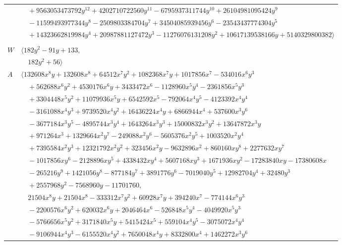 \documentclass[11pt]{article}
\begin{document}
\begin{longtable}{@{}ll@{}}
 & $\quad +9563053473792y^{12}+4202710722560y^{11}-6795937311744y^{10}+26104981095424y^{9}$\\
 & $\quad -11599493977344y^{8}-2509803384704y^{7}+34504085939456y^{6}-23543437774304y^{5}$\\
 & $\quad +14323662819984y^{4}+20987881127472y^{3}-11276076131208y^{2}+10617139538166y+5140329800382\rangle$\\
\addlinespace[2pt]
\multicolumn{2}{@{}p{0.97\textwidth}@{}}{$i=11$, $D_i=8$, $\rho_{ij}$: $1{:}1, \allowbreak 15{:}2, \allowbreak 16{:}2, \allowbreak 17{:}2, \allowbreak 48{:}1, \allowbreak 57{:}1, \allowbreak 64{:}2, \allowbreak 67{:}1$}\\
$W$ & $\langle 182y^{2}-91y+133,$\\
 & $\quad 182y^{2}+56\rangle$\\
$A$ & $\langle 132608x^{8}y+132608x^{8}+64512x^{7}y^{2}+1082368x^{7}y+1017856x^{7}-534016x^{6}y^{3}$\\
 & $\quad +562688x^{6}y^{2}+4530176x^{6}y+3433472x^{6}-1128960x^{5}y^{4}-2361856x^{5}y^{3}$\\
 & $\quad +3304448x^{5}y^{2}+11079936x^{5}y+6542592x^{5}-792064x^{4}y^{5}-4123392x^{4}y^{4}$\\
 & $\quad -3161088x^{4}y^{3}+9739520x^{4}y^{2}+16436224x^{4}y+6866944x^{4}+537600x^{3}y^{6}$\\
 & $\quad -3677184x^{3}y^{5}-4895744x^{3}y^{4}+1643264x^{3}y^{3}+15000832x^{3}y^{2}+13647872x^{3}y$\\
 & $\quad +971264x^{3}+1329664x^{2}y^{7}-249088x^{2}y^{6}-5605376x^{2}y^{5}+1003520x^{2}y^{4}$\\
 & $\quad +7395584x^{2}y^{3}+12321792x^{2}y^{2}+323456x^{2}y-9632896x^{2}+860160xy^{8}+2277632xy^{7}$\\
 & $\quad -1017856xy^{6}-2128896xy^{5}+4338432xy^{4}+5607168xy^{3}+1671936xy^{2}-17283840xy-17380608x$\\
 & $\quad -265216y^{9}+1421056y^{8}-877184y^{7}+3891776y^{6}-7019040y^{5}+12982704y^{4}+32480y^{3}$\\
 & $\quad +2557968y^{2}-7568960y-11701760,$\\
 & $\quad 21504x^{8}y+21504x^{8}-333312x^{7}y^{2}+60928x^{7}y+394240x^{7}-774144x^{6}y^{3}$\\
 & $\quad -2200576x^{6}y^{2}+620032x^{6}y+2046464x^{6}-526848x^{5}y^{4}-4049920x^{5}y^{3}$\\
 & $\quad -5766656x^{5}y^{2}+3171840x^{5}y+5415424x^{5}+559104x^{4}y^{5}-3075072x^{4}y^{4}$\\
 & $\quad -9106944x^{4}y^{3}-6155520x^{4}y^{2}+7650048x^{4}y+8332800x^{4}+1462272x^{3}y^{6}$\\

\end{longtable}
\end{document}
